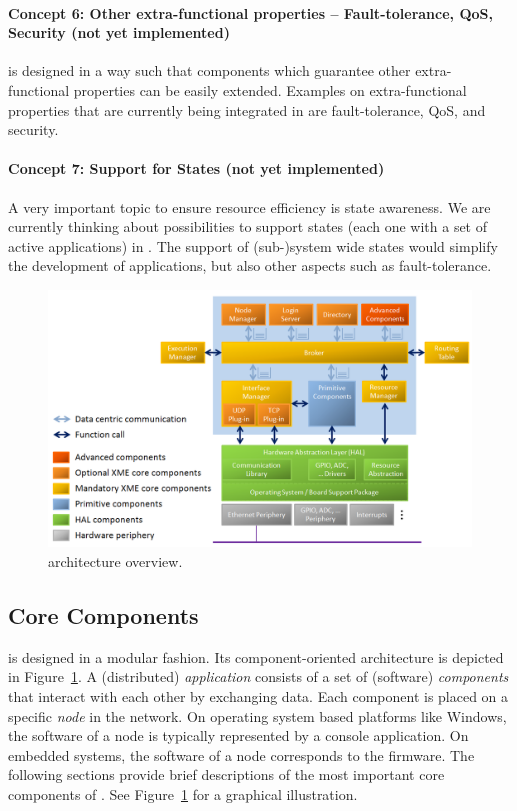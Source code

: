 \paragraph{Concept 6: Other extra-functional properties -- Fault-tolerance, QoS, Security (not yet implemented)}
\xme is designed in a way such that components which guarantee other extra-functional properties can be easily extended.
Examples on extra-functional properties that are currently being integrated in \xme are fault-tolerance, QoS, and security.

\paragraph{Concept 7: Support for States (not yet implemented)}
A very important topic to ensure resource efficiency is state awareness.
We are currently thinking about possibilities to support states
(each one with a set of active applications) in \xme.
The support of (sub-)system wide states would simplify the development of applications,
but also other aspects such as fault-tolerance.

\begin{figure}[htb]
	\centering
	\includegraphics[width=\textwidth]{figures/PNG/architecture.png}
	\caption{\xme architecture overview.}
	\label{fig:architecture}
\end{figure}

\subsection{Core Components}
\label{sec:core_components}
\xme is designed in a modular fashion. Its component-oriented architecture is depicted in Figure~\ref{fig:architecture}.
A (distributed) \emph{application} consists of a set of (software) \emph{components} that interact with each other by exchanging data.
Each component is placed on a specific \emph{node} in the network.
On operating system based platforms like Windows,
the software of a node is typically represented by a console application.
On embedded systems, the software of a node corresponds to the firmware.
%
The following sections provide brief descriptions of the most important core components of \xme.
See Figure~\ref{fig:architecture} for a graphical illustration.

